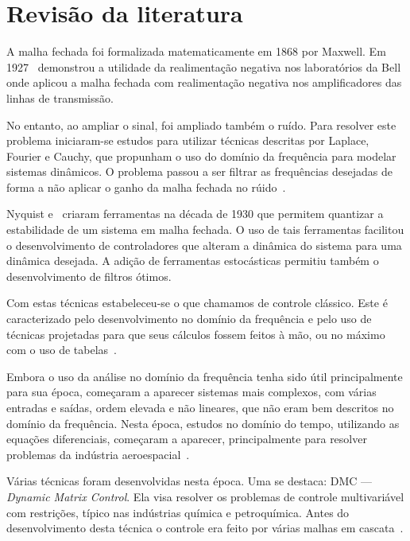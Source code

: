 
\chapter{Revisão da literatura}%
\label{chp:bibliography-review}

A malha fechada foi formalizada matematicamente em 1868 por Maxwell. Em
1927~\textcite{article:black} demonstrou a utilidade da realimentação negativa
nos laboratórios da Bell onde aplicou a malha fechada com realimentação negativa
nos amplificadores das linhas de transmissão.

No entanto, ao ampliar o sinal, foi ampliado também o ruído. Para resolver este
problema iniciaram-se estudos para utilizar técnicas descritas por Laplace,
Fourier e Cauchy, que propunham o uso do domínio da frequência para modelar
sistemas dinâmicos. O problema passou a ser filtrar as frequências desejadas de
forma a não aplicar o ganho da malha fechada no rúido~\cite{book:bryson}.

Nyquist e~\textcite{article:bode} criaram ferramentas na década de 1930 que
permitem quantizar a estabilidade de um sistema em malha fechada. O uso de tais
ferramentas facilitou o desenvolvimento de controladores que alteram a dinâmica
do sistema para uma dinâmica desejada. A adição de ferramentas estocásticas
permitiu também o desenvolvimento de filtros ótimos.

Com estas técnicas estabeleceu-se o que chamamos de controle clássico. Este é
caracterizado pelo desenvolvimento no domínio da frequência e pelo uso de
técnicas projetadas para que seus cálculos fossem feitos à mão, ou no máximo com
o uso de tabelas~\cite{book:dorf}.

Embora o uso da análise no domínio da frequência tenha sido útil principalmente
para sua época, começaram a aparecer sistemas mais complexos, com várias
entradas e saídas, ordem elevada e não lineares, que não eram bem descritos no
domínio da frequência. Nesta época, estudos no domínio do tempo, utilizando as
equações diferenciais, começaram a aparecer, principalmente para resolver
problemas da indústria aeroespacial~\cite{article:lyapunov}.

Várias técnicas foram desenvolvidas nesta época. Uma se destaca: \ac{DMC} ---
\textit{Dynamic Matrix Control}. Ela visa resolver os problemas de controle
multivariável com restrições, típico nas indústrias química e petroquímica.
Antes do desenvolvimento desta técnica o controle era feito por várias malhas em
cascata~\cite{article:cutler}.

